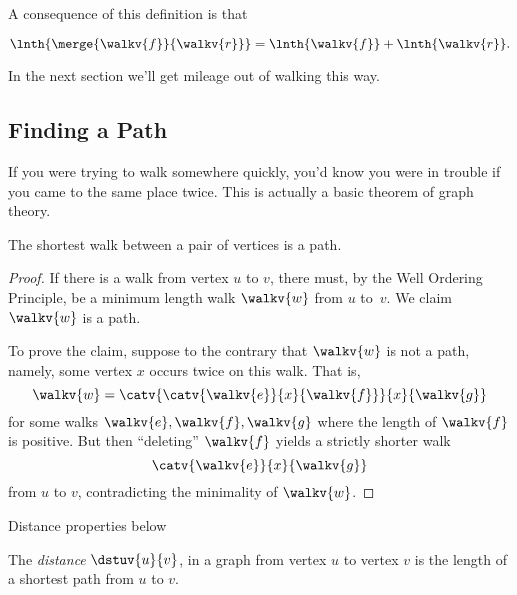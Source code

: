 A consequence of this definition is that
\begin{lemma}\label{sumoflengths}
\[
\lnth{\merge{\walkv{f}}{\walkv{r}}} = \lnth{\walkv{f}} + \lnth{\walkv{r}}.
\]
\end{lemma}
In the next section we'll get mileage out of walking this way.

\subsection{Finding a Path}
If you were trying to walk somewhere quickly, you'd know you were in
trouble if you came to the same place twice.  This is actually a basic
theorem of graph theory.

\begin{theorem}\label{shortestwalk_thm}
The shortest walk between a pair of vertices is a path.
\end{theorem}

\begin{proof}
  If there is a walk from vertex $u$ to $v$, there must, by the Well
  Ordering Principle, be a minimum length walk $\walkv{w}$ from $u$
  to~$v$.  We claim $\walkv{w}$ is a path.

  To prove the claim, suppose to the contrary that $\walkv{w}$ is not a
  path, namely, some vertex $x$ occurs twice on this walk.  That is,
\[
\walkv{w} = \catv{\catv{\walkv{e}}{x}{\walkv{f}}}{x}{\walkv{g}}
\]
for some walks $\walkv{e}, \walkv{f}, \walkv{g}$ where the length of
$\walkv{f}$ is positive.  But then ``deleting'' $\walkv{f}$ yields a
strictly shorter walk
\[
\catv{\walkv{e}}{x}{\walkv{g}}
\]
from $u$ to $v$, contradicting the minimality of $\walkv{w}$.
\end{proof}

\iffalse

Actually, we proved something stronger:
\begin{corollary}\label{pathlewalk_cor}
For any walk in a digraph, there is a path starting and ending at the
same vertices as the walk and containing only edges in the walk.  Such
a path is necessarily no longer than the walk.
\end{corollary}
\fi

\begin{editingnotes}
Distance properties below 
\end{editingnotes}

\begin{definition}
  The  \emph{distance}
  $\dstuv{u}{v}$, in a graph from vertex $u$ to vertex $v$ is the
  length of a shortest path from $u$ to $v$.
\end{definition}

